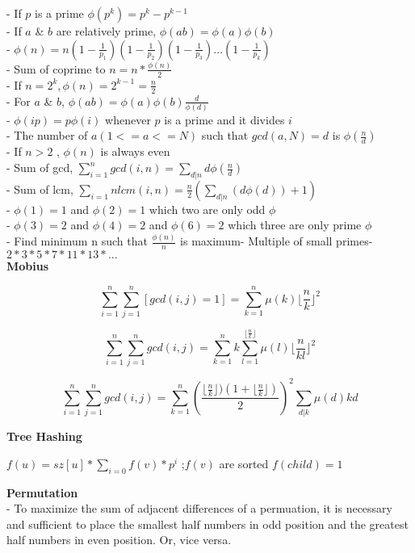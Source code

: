 - If \( p \) is a prime \( \phi(p^k) = p^k - p^{k-1} \) \\
- If \( a \) \& \( b \) are relatively prime, \( \phi(ab) = \phi(a)\phi(b) \) \\
- \( \phi(n) = n(1-\frac{1}{p_1})(1-\frac{1}{p_2})(1-\frac{1}{p_3})...(1-\frac{1}{p_k}) \) \\
- Sum of coprime to \( n = n * \frac{\phi(n)}{2} \) \\
- If \( n = 2^k, \phi(n) = 2^{k - 1} = \frac{n}{2} \) \\
- For \( a \) \& \( b \), \( \phi(ab) = \phi(a)\phi(b)\frac{d}{\phi(d)} \) \\
- \( \phi (ip) = p \phi(i) \) whenever \( p \) is a prime and it divides \( i \) \\
- The number of \( a (1<= a <=N) \) such that \( gcd(a, N)=d \) is \( \phi(\frac{n}{d}) \) \\
- If \( n > 2 \) , \( \phi(n) \) is always even \\
- Sum of gcd, \( \sum_{i=1}^n gcd(i, n) = \sum_{d|n} d \phi(\frac{n}{d}) \) \\
- Sum of lcm, \( \sum_{i=1}{n}lcm(i, n) = \frac{n}{2}(\sum_{d|n}(d \phi(d))+1) \) \\
- \( \phi(1) = 1 \) and \( \phi(2) = 1 \) which two are only odd \( \phi \) \\
- \( \phi(3) = 2 \) and \( \phi(4) = 2 \) and \( \phi(6) = 2 \) which three are only prime \( \phi \) \\
- Find minimum n such that $ \frac{\phi(n)} {n} $ is  maximum- Multiple of small primes- $ 2 * 3 * 5 * 7 * 11 * 13 * ... $ \\

\textbf{Mobius}

\[ \sum_{i = 1}^n \sum_{j = 1}^n [gcd(i, j) = 1] = \sum_{k = 1}^n \mu(k) \lfloor \frac{n}{k} \rfloor^2 \]

\[ \sum_{i = 1}^n \sum_{j = 1}^n gcd(i, j) = \sum_{k = 1}^n k \sum_{l = 1}^{\lfloor \frac{n}{k} \rfloor} \mu(l) \lfloor {\frac{n}{kl}} \rfloor^2 \]

\[ \sum_{i = 1}^n \sum_{j = 1}^n gcd(i, j) = \sum_{k = 1}^n (\frac{\lfloor \frac{n}{k} \rfloor) (1 + \lfloor \frac{n}{k} \rfloor) }{2})^2 \sum_{d | k} \mu (d) kd \]

\textbf{Tree Hashing}

$f(u) = sz[u] * \sum_{i = 0} f(v) * p^{i}$ ;$ f(v) $ are sorted 
\( f(child) = 1 \)

\textbf{Permutation} \\
- To maximize the sum of adjacent differences of a permuation, it is necessary and sufficient to place the smallest half numbers in odd position and the greatest half numbers in even position. Or, vice versa.

